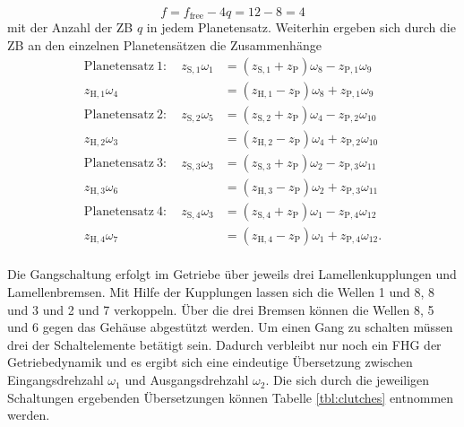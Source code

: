 \begin{equation}
f=f_{\textrm{free}}-4q = 12-8 = 4
\end{equation}
mit der Anzahl der ZB $q$ in jedem Planetensatz. Weiterhin ergeben sich durch die ZB an den einzelnen Planetensätzen die Zusammenhänge
\begin{subequations}\label{eq:zwangsbedingungen}
	\begin{align} 
\mathrm{Planetensatz\ 1}: \quad z_{\mathrm{S},1} \omega_{1}  &= (z_{\mathrm{S},1} + z_\mathrm{P}) \omega_{8} - z_{\mathrm{P},1} \omega_{9}\\
z_{\mathrm{H},1} \omega_{4}  &= (z_{\mathrm{H},1} - z_\mathrm{P}) \omega_{8} + z_{\mathrm{P},1} \omega_{9} \\
\mathrm{Planetensatz\ 2}: \quad z_{\mathrm{S},2} \omega_{5}  &= (z_{\mathrm{S},2} + z_\mathrm{P}) \omega_{4} - z_{\mathrm{P},2} \omega_{10} \\
z_{\mathrm{H},2} \omega_{3}  &= (z_{\mathrm{H},2} - z_\mathrm{P}) \omega_{4} + z_{\mathrm{P},2} \omega_{10} \\
\mathrm{Planetensatz\ 3}: \quad z_{\mathrm{S},3} \omega_{3}  &= (z_{\mathrm{S},3} + z_\mathrm{P}) \omega_{2} - z_{\mathrm{P},3} \omega_{11} \\
z_{\mathrm{H},3} \omega_{6}  &= (z_{\mathrm{H},3} - z_\mathrm{P}) \omega_{2} + z_{\mathrm{P},3} \omega_{11} \\
\mathrm{Planetensatz\ 4}: \quad z_{\mathrm{S},4} \omega_{3}  &= (z_{\mathrm{S},4} + z_\mathrm{P}) \omega_{1} - z_{\mathrm{P},4} \omega_{12} \\
z_{\mathrm{H},4} \omega_{7}  &= (z_{\mathrm{H},4} - z_\mathrm{P}) \omega_{1} + z_{\mathrm{P},4} \omega_{12}.
	\end{align}
\end{subequations} 
\\
Die Gangschaltung erfolgt im Getriebe über jeweils drei Lamellenkupplungen und Lamellenbremsen. Mit Hilfe der Kupplungen lassen sich die Wellen 1 und 8, 8 und 3 und 2 und 7 verkoppeln. Über die drei Bremsen können die Wellen 8, 5 und 6 gegen das Gehäuse abgestützt werden. Um einen Gang zu schalten müssen drei der Schaltelemente betätigt sein. Dadurch verbleibt nur noch ein FHG der Getriebedynamik und es ergibt sich eine eindeutige Übersetzung zwischen Eingangsdrehzahl $\omega_{1}$ und Ausgangsdrehzahl $\omega_2$. Die sich durch die jeweiligen Schaltungen ergebenden Übersetzungen können Tabelle \ref{tbl:clutches} entnommen werden.
